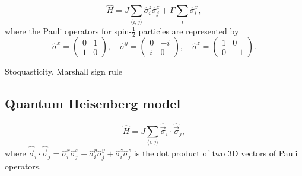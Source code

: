 \begin{equation}
\hat{H} = J \sum_{\langle i, j \rangle} \hat{\sigma}^z_i \hat{\sigma}^z_j + \Gamma \sum_i \hat{\sigma}^x_i,
\end{equation}
where the Pauli operators for spin-$\frac{1}{2}$ particles are represented by
\begin{equation}
\hat{\sigma}^x = \begin{pmatrix} 0 & 1 \\ 1 & 0 \end{pmatrix}, \quad
\hat{\sigma}^y = \begin{pmatrix} 0 & -i \\ i & 0 \end{pmatrix}, \quad
\hat{\sigma}^z = \begin{pmatrix} 1 & 0 \\ 0 & -1 \end{pmatrix}.
\end{equation}

Stoquasticity, Marshall sign rule

\subsection{Quantum Heisenberg model}

\begin{equation}
\hat{H} = J \sum_{\langle i, j \rangle} \hat{\vec{\sigma}}_i \cdot \hat{\vec{\sigma}}_j,
\end{equation}
where $\hat{\vec{\sigma}}_i \cdot \hat{\vec{\sigma}}_j = \hat{\sigma}^x_i \hat{\sigma}^x_j + \hat{\sigma}^y_i \hat{\sigma}^y_j + \hat{\sigma}^z_i \hat{\sigma}^z_j$ is the dot product of two 3D vectors of Pauli operators.
